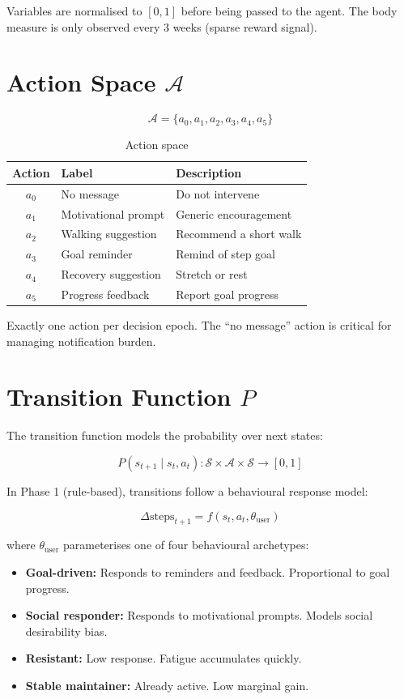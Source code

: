 \documentclass[11pt,a4paper]{article}
\begin{document}
Variables are normalised to $[0,1]$ before being passed to the agent. The body
measure is only observed every 3 weeks (sparse reward signal).

\section{Action Space $\mathcal{A}$}

\[
\mathcal{A} = \{ a_0, a_1, a_2, a_3, a_4, a_5 \}
\]

\begin{table}[h]
\centering
\caption{Action space}
\begin{tabular}{cll}
\toprule
Action & Label & Description \\
\midrule
$a_0$ & No message & Do not intervene \\
$a_1$ & Motivational prompt & Generic encouragement \\
$a_2$ & Walking suggestion & Recommend a short walk \\
$a_3$ & Goal reminder & Remind of step goal \\
$a_4$ & Recovery suggestion & Stretch or rest \\
$a_5$ & Progress feedback & Report goal progress \\
\bottomrule
\end{tabular}
\end{table}

Exactly one action per decision epoch. The ``no message'' action is critical
for managing notification burden.

\section{Transition Function $P$}

The transition function models the probability over next states:

\[
P(s_{t+1} \mid s_t, a_t): \mathcal{S} \times \mathcal{A} \times \mathcal{S}
\rightarrow [0,1]
\]

In Phase 1 (rule-based), transitions follow a behavioural response model:

\[
\Delta \text{steps}_{t+1} = f(s_t, a_t, \theta_{\text{user}})
\]

where $\theta_{\text{user}}$ parameterises one of four behavioural archetypes:

\begin{itemize}
    \item \textbf{Goal-driven:} Responds to reminders and feedback.
    Proportional to goal progress.
    \item \textbf{Social responder:} Responds to motivational prompts.
    Models social desirability bias.
    \item \textbf{Resistant:} Low response. Fatigue accumulates quickly.
    \item \textbf{Stable maintainer:} Already active. Low marginal gain.
\end{itemize}
\end{document}
